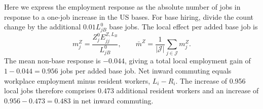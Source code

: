 \documentclass[12pt, unicode, a4paper]{article}
\newcommand{\1}{\mbox{1}\hspace{-0.25em}\mbox{l}} %
\begin{document}
Here we express the employment response as the absolute number of jobs in response to a one-job increase in the US bases. 
For base hiring, divide the count change by the additional $0.01L_{jB}^0$ base jobs. The local effect per added base job is
\begin{equation*}
    m_j^Z=\frac{Z_j^0E_{jj}^{Z,L_B}}{L_{jB}^0},
    \qquad
    \bar m^Z=\frac{1}{|\mathcal J|}\sum_{j\in\mathcal J}m_j^Z.
\end{equation*}
The mean non-base response is $-0.044$, giving a total local employment gain of $1-0.044=0.956$ jobs per added base job. Net inward commuting equals workplace employment minus resident workers, $L_i-R_i$. The increase of 0.956 local jobs therefore comprises 0.473 additional resident workers and an increase of $0.956-0.473=0.483$ in net inward commuting.


\end{document}
